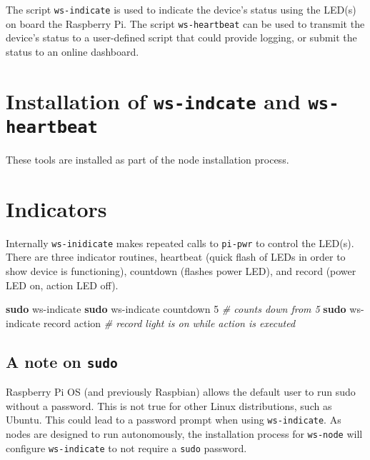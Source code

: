 \documentclass[
]{book}
\newenvironment{Shaded}{\begin{snugshade}}{\end{snugshade}}
\newcommand{\CommentTok}[1]{\textcolor[rgb]{0.56,0.35,0.01}{\textit{#1}}}
\newcommand{\FunctionTok}[1]{\textcolor[rgb]{0.13,0.29,0.53}{\textbf{#1}}}
\newcommand{\NormalTok}[1]{#1}
\begin{document}
The script \texttt{ws-indicate} is used to indicate the device's status using the LED(s) on board the Raspberry Pi. The script \texttt{ws-heartbeat} can be used to transmit the device's status to a user-defined script that could provide logging, or submit the status to an online dashboard.

\hypertarget{installation-of-ws-indcate-and-ws-heartbeat}{%
\section{\texorpdfstring{Installation of \texttt{ws-indcate} and \texttt{ws-heartbeat}}{Installation of ws-indcate and ws-heartbeat}}\label{installation-of-ws-indcate-and-ws-heartbeat}}

These tools are installed as part of the node installation process.

\hypertarget{indicators}{%
\section{Indicators}\label{indicators}}

Internally \texttt{ws-inidicate} makes repeated calls to \texttt{pi-pwr} to control the LED(s). There are three indicator routines, heartbeat (quick flash of LEDs in order to show device is functioning), countdown (flashes power LED), and record (power LED on, action LED off).

\begin{Shaded}
\begin{Highlighting}[]
\FunctionTok{sudo}\NormalTok{ ws{-}indicate}
\FunctionTok{sudo}\NormalTok{ ws{-}indicate countdown 5   }\CommentTok{\# counts down from 5}
\FunctionTok{sudo}\NormalTok{ ws{-}indicate record action }\CommentTok{\# record light is on while action is executed}
\end{Highlighting}
\end{Shaded}

\hypertarget{a-note-on-sudo-1}{%
\subsection{\texorpdfstring{A note on \texttt{sudo}}{A note on sudo}}\label{a-note-on-sudo-1}}

Raspberry Pi OS (and previously Raspbian) allows the default user to run sudo without a password. This is not true for other Linux distributions, such as Ubuntu. This could lead to a password prompt when using \texttt{ws-indicate}. As nodes are designed to run autonomously, the installation process for \texttt{ws-node} will configure \texttt{ws-indicate} to not require a \texttt{sudo} password.
\end{document}
